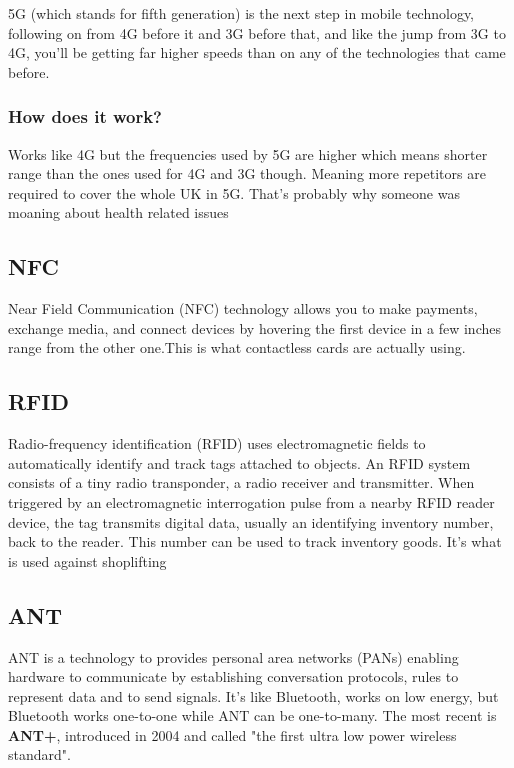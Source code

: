 \documentclass[a4paper,12pt]{book}
\begin{document}
5G (which stands for fifth generation) is the next step in mobile technology, following on from 4G before it and 3G before that, and like the jump from 3G to 4G, you’ll be getting far higher speeds than on any of the technologies that came before.

\subsubsection{How does it work?}
Works like 4G but the frequencies used by 5G are higher which means shorter range than the ones used for 4G and 3G though. Meaning more repetitors are required to cover the whole UK in 5G. That's probably why someone was moaning about health related issues

\subsection{NFC}

Near Field Communication (NFC) technology allows you to make payments, exchange media, and connect devices by hovering the first device in a few inches range from the other one.This is what contactless cards are actually using.

\subsection{RFID}
Radio-frequency identification (RFID) uses electromagnetic fields to automatically identify and track tags attached to objects. An RFID system consists of a tiny radio transponder, a radio receiver and transmitter. When triggered by an electromagnetic interrogation pulse from a nearby RFID reader device, the tag transmits digital data, usually an identifying inventory number, back to the reader. This number can be used to track inventory goods. It's what is used against shoplifting

\subsection{ANT}
ANT is a technology to provides personal area networks (PANs) enabling hardware to communicate by establishing conversation protocols, rules to represent data and to send signals. It's like Bluetooth, works on low energy, but Bluetooth works one-to-one while ANT can be one-to-many. The most recent is \textbf{ANT+}, introduced in 2004 and called "the first ultra low power wireless standard".
\end{document}

